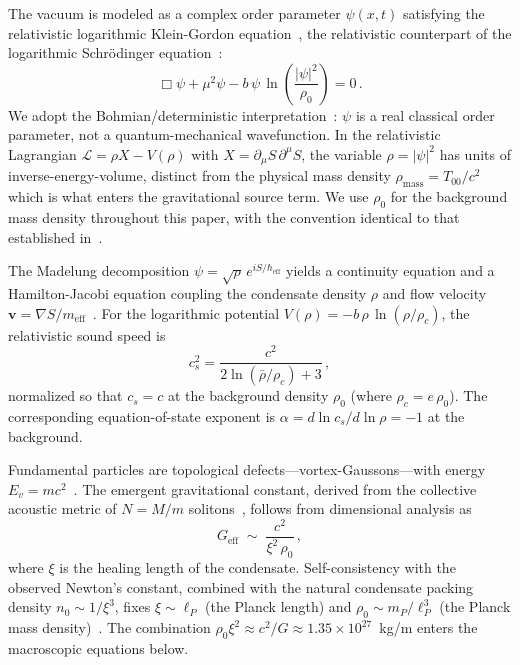 \documentclass[12pt, a4paper]{article}
\newcommand{\Geff}{G_{\mathrm{eff}}}
\newcommand{\meff}{m_{\mathrm{eff}}}
\newcommand{\heff}{\hbar_{\mathrm{eff}}}
\newcommand{\rhob}{\bar{\rho}}
\begin{document}
The vacuum is modeled as a complex order parameter $\psi(x,t)$ satisfying the relativistic logarithmic Klein-Gordon equation~\cite{rosen_1969,bartkowski_gorka_2008}, the relativistic counterpart of the logarithmic Schr\"{o}dinger equation~\cite{bialynicki_birula_1979}:
\begin{equation}
    \Box\psi + \mu^2\psi - b\,\psi\,\ln\!\left(\frac{|\psi|^2}{\rho_0}\right) = 0\,.
\label{eq:log_kg}
\end{equation}
We adopt the Bohmian/deterministic interpretation~\cite{madelung_1927,bohm_1952,holland_1993}: $\psi$ is a real classical order parameter, not a quantum-mechanical wavefunction. In the relativistic Lagrangian $\mathcal{L} = \rho X - V(\rho)$ with $X = \partial_\mu S\,\partial^\mu S$, the variable $\rho = |\psi|^2$ has units of inverse-energy-volume, distinct from the physical mass density $\rho_{\mathrm{mass}} = T_{00}/c^2$ which is what enters the gravitational source term. We use $\rho_0$ for the background mass density throughout this paper, with the convention identical to that established in~\cite{kulangiev_2026a,kulangiev_2026b}.

The Madelung decomposition $\psi = \sqrt{\rho}\,e^{iS/\heff}$ yields a continuity equation and a Hamilton-Jacobi equation coupling the condensate density $\rho$ and flow velocity $\mathbf{v} = \nabla S/\meff$~\cite{kulangiev_2026a}. For the logarithmic potential $V(\rho) = -b\,\rho\,\ln(\rho/\rho_c)$, the relativistic sound speed is~\cite{kulangiev_2026a}
\begin{equation}
    c_s^2 = \frac{c^2}{2\ln(\rhob/\rho_c) + 3}\,,
\label{eq:cs_log}
\end{equation}
normalized so that $c_s = c$ at the background density $\rho_0$ (where $\rho_c = e\,\rho_0$). The corresponding equation-of-state exponent is $\alpha = d\ln c_s/d\ln\rho = -1$ at the background.

Fundamental particles are topological defects---vortex-Gaussons---with energy $E_v = mc^2$~\cite{bialynicki_birula_1979}. The emergent gravitational constant, derived from the collective acoustic metric of $N = M/m$ solitons~\cite{kulangiev_2026b}, follows from dimensional analysis as
\begin{equation}
    \Geff \;\sim\; \frac{c^2}{\xi^2\,\rho_0}\,,
\label{eq:G_eff}
\end{equation}
where $\xi$ is the healing length of the condensate. Self-consistency with the observed Newton's constant, combined with the natural condensate packing density $n_0 \sim 1/\xi^3$, fixes $\xi \sim \ell_P$ (the Planck length) and $\rho_0 \sim m_P/\ell_P^3$ (the Planck mass density)~\cite{kulangiev_2026e}. The combination $\rho_0\xi^2 \approx c^2/G \approx 1.35 \times 10^{27}$~kg/m enters the macroscopic equations below.
\end{document}
